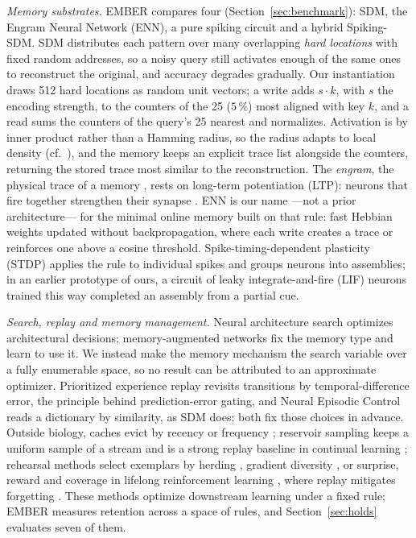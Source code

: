 \documentclass[conference]{IEEEtran}
\begin{document}
\emph{Memory substrates.} EMBER compares four (Section~\ref{sec:benchmark}):
SDM, the Engram Neural Network (ENN), a pure spiking circuit and a hybrid
Spiking-SDM. SDM \cite{kanerva1988} distributes each pattern
over many overlapping \emph{hard locations} with fixed random addresses, so a
noisy query still activates enough of the same ones to reconstruct the
original, and accuracy degrades gradually. Our instantiation draws 512 hard
locations as random unit vectors; a write adds $s\cdot k$, with $s$ the
encoding strength, to the counters of the 25 ($5\,\%$) most aligned with key
$k$, and a read sums the counters of the query's 25 nearest and normalizes.
Activation is by inner product rather than a Hamming radius, so the radius
adapts to local density (cf.\ \cite{kanerva2009}), and the memory keeps an
explicit trace list alongside the counters, returning the stored trace most
similar to the reconstruction. The \emph{engram}, the physical trace of a
memory \cite{semon1904,liu2012}, rests on long-term potentiation (LTP): neurons
that fire together strengthen their synapse \cite{hebb1949}. ENN is our
name ---not a prior architecture---
for the minimal online memory built on that rule: fast Hebbian weights updated
without backpropagation, where each write creates a trace or reinforces one
above a cosine threshold. Spike-timing-dependent plasticity (STDP)
\cite{bipoo1998} applies the rule to individual spikes and groups neurons into
assemblies; in an earlier prototype of ours, a circuit of leaky
integrate-and-fire (LIF) neurons trained this way completed an assembly from a
partial cue.

\emph{Search, replay and memory management.} Neural architecture search
\cite{elsken2019} optimizes architectural decisions; memory-augmented networks
\cite{graves2014,munkhdalai2017} fix the memory type and learn to use it. We
instead make the memory mechanism the search variable over a fully enumerable
space, so no result can be attributed to an approximate optimizer.
Prioritized experience replay \cite{schaul2016} revisits transitions by
temporal-difference error, the principle behind prediction-error gating, and
Neural Episodic Control \cite{pritzel2017} reads a dictionary by similarity,
as SDM does; both fix those choices in advance. Outside biology, caches evict
by recency or frequency \cite{oneil1993,megiddo2003}; reservoir sampling keeps
a uniform sample of a stream \cite{vitter1985} and is a strong replay baseline
in continual learning \cite{chaudhry2019}; rehearsal methods select exemplars
by herding \cite{rebuffi2017}, gradient diversity \cite{aljundi2019}, or
surprise, reward and coverage in lifelong reinforcement learning
\cite{isele2018}, where replay mitigates forgetting \cite{rolnick2019}. These
methods optimize downstream learning under a fixed rule; EMBER measures
retention across a space of rules, and Section~\ref{sec:holds} evaluates seven
of them.
\end{document}
